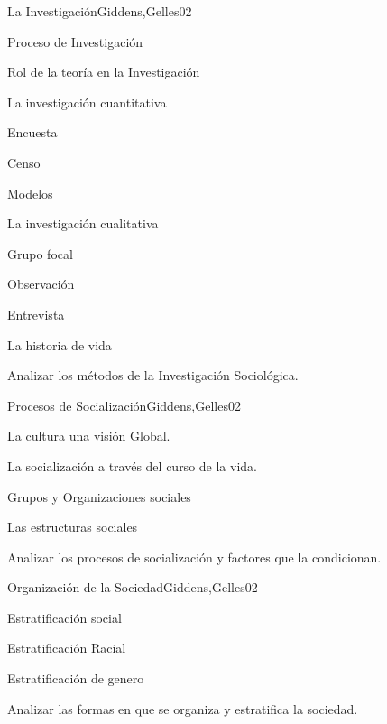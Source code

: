 \begin{syllabus}
\begin{unit}{La Investigación}{Giddens,Gelles}{0}{2}
    \begin{topics}
      \item Proceso de Investigación
      \item Rol de la teoría en la Investigación
      \item La investigación cuantitativa
      \item Encuesta
      \item Censo
      \item Modelos
      \item La investigación cualitativa
      \item Grupo focal
      \item Observación
      \item Entrevista
      \item La historia de vida
    \end{topics}
    \begin{learningoutcomes}
      \item Analizar los métodos de la Investigación Sociológica.
    \end{learningoutcomes}
\end{unit}

\begin{unit}{Procesos de Socialización}{Giddens,Gelles}{0}{2}
    \begin{topics}
      \item La cultura una visión Global.
      \item La socialización a través del curso de la vida.
      \item Grupos y Organizaciones sociales
      \item Las estructuras sociales
    \end{topics}
    \begin{learningoutcomes}
      \item Analizar los procesos de socialización y factores que la condicionan.
    \end{learningoutcomes}
\end{unit}

\begin{unit}{Organización de la Sociedad}{Giddens,Gelles}{0}{2}
    \begin{topics}
      \item Estratificación social
      \item Estratificación Racial
      \item Estratificación de genero
    \end{topics}
    \begin{learningoutcomes}
      \item Analizar las formas en que se organiza y estratifica la sociedad.
    \end{learningoutcomes}
\end{unit}


\end{syllabus}
